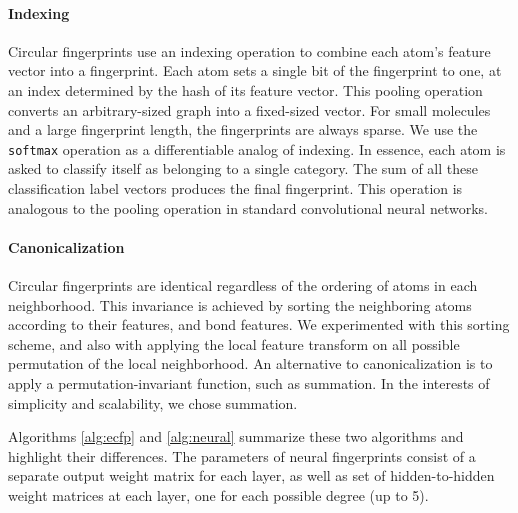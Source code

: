 \documentclass{article}
\begin{document}
\paragraph{Indexing}
Circular fingerprints use an indexing operation to combine each atom's feature vector into a fingerprint.
Each atom sets a single bit of the fingerprint to one, at an index determined by the hash of its feature vector.
This pooling operation converts an arbitrary-sized graph into a fixed-sized vector.
For small molecules and a large fingerprint length, the fingerprints are always sparse.
We use the \texttt{softmax} operation as a differentiable analog of indexing.
In essence, each atom is asked to classify itself as belonging to a single category.
The sum of all these classification label vectors produces the final fingerprint.
This operation is analogous to the pooling operation in standard convolutional neural networks.

\paragraph{Canonicalization}
Circular fingerprints are identical regardless of the ordering of atoms in each neighborhood.
This invariance is achieved by sorting the neighboring atoms according to their features, and bond features.
We experimented with this sorting scheme, and also with applying the local feature transform on all possible permutation of the local neighborhood.
An alternative to canonicalization is to apply a permutation-invariant function, such as summation.
In the interests of simplicity and scalability, we chose summation.

Algorithms \ref{alg:ecfp} and \ref{alg:neural} summarize these two algorithms and highlight their differences.
The parameters of neural fingerprints consist of a separate output weight matrix for each layer, as well as set of hidden-to-hidden weight matrices at each layer, one for each possible degree (up to 5).
\end{document}
